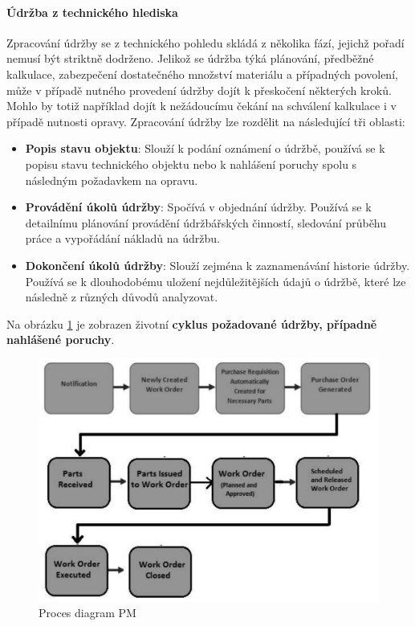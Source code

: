 \documentclass[thesis=M,czech]{FITthesis}[2012/06/26]
\begin{document}
\paragraph{Údržba z technického hlediska}
Zpracování údržby se z technického pohledu skládá z několika fází, jejichž pořadí nemusí být striktně dodrženo. Jelikož se údržba týká plánování, předběžné kalkulace, zabezpečení dostatečného množství materiálu a případných povolení, může v případě nutného provedení údržby dojít k přeskočení některých kroků. Mohlo by totiž například dojít k nežádoucímu čekání na schválení kalkulace i v případě nutnosti opravy. Zpracování údržby lze rozdělit na následující tři oblasti:
\begin{itemize}
	\item
	\textbf{Popis stavu objektu}: Slouží k podání oznámení o údržbě, používá se k popisu stavu technického objektu nebo k nahlášení poruchy spolu s následným požadavkem na opravu.
	\item
	\textbf{Provádění úkolů údržby}: Spočívá v objednání údržby. Používá se k detailnímu plánování provádění údržbářských činností, sledování průběhu práce a vypořádání nákladů na údržbu.
	\item
	\textbf{Dokončení úkolů údržby}: Slouží zejména k zaznamenávání historie údržby. Používá se k dlouhodobému uložení nejdůležitějších údajů o údržbě, které lze následně z různých důvodů analyzovat. 
\end{itemize} 
Na obrázku \ref{img:pm_process} je zobrazen životní \textbf{cyklus požadované údržby, případně nahlášené poruchy}.
\begin{figure}[H]
	\centering
	\includegraphics[width=1\textwidth]{images/pm_process.jpg}
	\caption{Proces diagram PM \cite{sap_pm_document}}
	\label{img:pm_process}
\end{figure}
\end{document}
